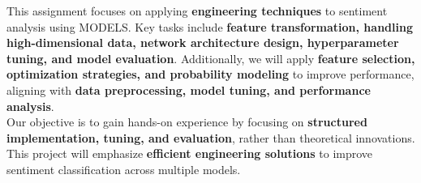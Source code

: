This assignment focuses on applying \textbf{engineering techniques} to sentiment analysis using MODELS. Key tasks include \textbf{feature transformation, handling high-dimensional data, network architecture design, hyperparameter tuning, and model evaluation}. Additionally, we will apply \textbf{feature selection, optimization strategies, and probability modeling} to improve performance, aligning with \textbf{data preprocessing, model tuning, and performance analysis}.\\

Our objective is to gain hands-on experience by focusing on \textbf{structured implementation, tuning, and evaluation}, rather than theoretical innovations. This project will emphasize \textbf{efficient engineering solutions} to improve sentiment classification across multiple models.

\newpage
